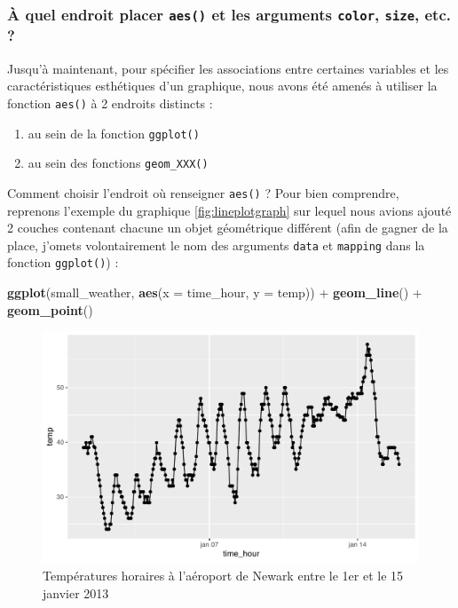 \documentclass[a4paperpaper,]{article}
\newenvironment{Shaded}{\begin{snugshade}}{\end{snugshade}}
\newcommand{\DataTypeTok}[1]{\textcolor[rgb]{0.00,0.34,0.68}{#1}}
\newcommand{\KeywordTok}[1]{\textcolor[rgb]{0.12,0.11,0.11}{\textbf{#1}}}
\newcommand{\NormalTok}[1]{\textcolor[rgb]{0.12,0.11,0.11}{#1}}
\newcommand{\OperatorTok}[1]{\textcolor[rgb]{0.12,0.11,0.11}{#1}}
\newcommand{\StringTok}[1]{\textcolor[rgb]{0.75,0.01,0.01}{#1}}
\providecommand{\tightlist}{%
  \setlength{\itemsep}{0pt}\setlength{\parskip}{0pt}}
\theoremstyle{definition}
\theoremstyle{definition}
\theoremstyle{definition}
\theoremstyle{remark}
\begin{document}
\hypertarget{a-quel-endroit-placer-aes-et-les-arguments-color-size-etc.}{%
\subsubsection{\texorpdfstring{À quel endroit placer \texttt{aes()} et
les arguments \texttt{color}, \texttt{size}, etc.
?}{À quel endroit placer aes() et les arguments color, size, etc. ?}}\label{a-quel-endroit-placer-aes-et-les-arguments-color-size-etc.}}

Jusqu'à maintenant, pour spécifier les associations entre certaines
variables et les caractéristiques esthétiques d'un graphique, nous avons
été amenés à utiliser la fonction \texttt{aes()} à 2 endroits distincts
:

\begin{enumerate}
\def\labelenumi{\arabic{enumi}.}
\tightlist
\item
  au sein de la fonction \texttt{ggplot()}
\item
  au sein des fonctions \texttt{geom\_XXX()}
\end{enumerate}

Comment choisir l'endroit où renseigner \texttt{aes()} ? Pour bien
comprendre, reprenons l'exemple du graphique \ref{fig:lineplotgraph} sur
lequel nous avions ajouté 2 couches contenant chacune un objet
géométrique différent (afin de gagner de la place, j'omets
volontairement le nom des arguments \texttt{data} et \texttt{mapping}
dans la fonction \texttt{ggplot()}) :

\begin{Shaded}
\begin{Highlighting}[]
\KeywordTok{ggplot}\NormalTok{(small_weather, }\KeywordTok{aes}\NormalTok{(}\DataTypeTok{x =}\NormalTok{ time_hour, }\DataTypeTok{y =}\NormalTok{ temp)) }\OperatorTok{+}
\StringTok{  }\KeywordTok{geom_line}\NormalTok{() }\OperatorTok{+}
\StringTok{  }\KeywordTok{geom_point}\NormalTok{()}
\end{Highlighting}
\end{Shaded}

\begin{figure}[htpb]

{\centering \includegraphics[width=0.9\linewidth]{figure/lineplotgraph2-1} 

}

\caption{Températures horaires à l'aéroport de Newark entre le 1er et le 15 janvier 2013}\label{fig:lineplotgraph2}
\end{figure}
\end{document}
